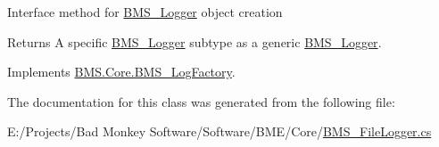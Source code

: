Interface method for \hyperlink{class_b_m_s_1_1_core_1_1_b_m_s___logger}{B\-M\-S\-\_\-\-Logger} object creation 

\begin{DoxyReturn}{Returns}
A specific \hyperlink{class_b_m_s_1_1_core_1_1_b_m_s___logger}{B\-M\-S\-\_\-\-Logger} subtype as a generic \hyperlink{class_b_m_s_1_1_core_1_1_b_m_s___logger}{B\-M\-S\-\_\-\-Logger}.
\end{DoxyReturn}


Implements \hyperlink{class_b_m_s_1_1_core_1_1_b_m_s___log_factory_aae44a65a49e0f08985f692d180c0931d}{B\-M\-S.\-Core.\-B\-M\-S\-\_\-\-Log\-Factory}.



The documentation for this class was generated from the following file\-:\begin{DoxyCompactItemize}
\item 
E\-:/\-Projects/\-Bad Monkey Software/\-Software/\-B\-M\-E/\-Core/\hyperlink{_b_m_s___file_logger_8cs}{B\-M\-S\-\_\-\-File\-Logger.\-cs}\end{DoxyCompactItemize}
